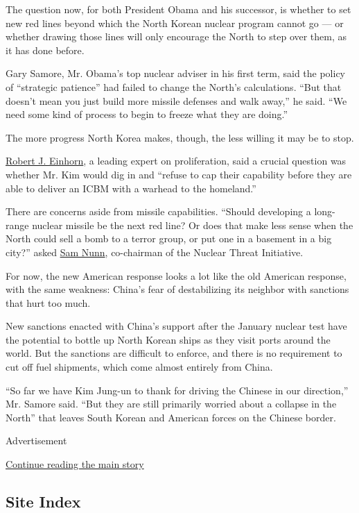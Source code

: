 The question now, for both President Obama and his successor, is whether
to set new red lines beyond which the North Korean nuclear program
cannot go --- or whether drawing those lines will only encourage the
North to step over them, as it has done before.

Gary Samore, Mr. Obama's top nuclear adviser in his first term, said the
policy of ``strategic patience'' had failed to change the North's
calculations. ``But that doesn't mean you just build more missile
defenses and walk away,'' he said. ``We need some kind of process to
begin to freeze what they are doing.''

The more progress North Korea makes, though, the less willing it may be
to stop.

\href{http://www.brookings.edu/experts/einhornr}{Robert J. Einhorn}, a
leading expert on proliferation, said a crucial question was whether Mr.
Kim would dig in and ``refuse to cap their capability before they are
able to deliver an ICBM with a warhead to the homeland.''

There are concerns aside from missile capabilities. ``Should developing
a long-range nuclear missile be the next red line? Or does that make
less sense when the North could sell a bomb to a terror group, or put
one in a basement in a big city?'' asked
\href{http://csis.org/expert/sam-nunn}{Sam Nunn}, co-chairman of the
Nuclear Threat Initiative.

For now, the new American response looks a lot like the old American
response, with the same weakness: China's fear of destabilizing its
neighbor with sanctions that hurt too much.

New sanctions enacted with China's support after the January nuclear
test have the potential to bottle up North Korean ships as they visit
ports around the world. But the sanctions are difficult to enforce, and
there is no requirement to cut off fuel shipments, which come almost
entirely from China.

``So far we have Kim Jung-un to thank for driving the Chinese in our
direction,'' Mr. Samore said. ``But they are still primarily worried
about a collapse in the North'' that leaves South Korean and American
forces on the Chinese border.

Advertisement

\protect\hyperlink{after-bottom}{Continue reading the main story}

\hypertarget{site-index}{%
\subsection{Site Index}\label{site-index}}

